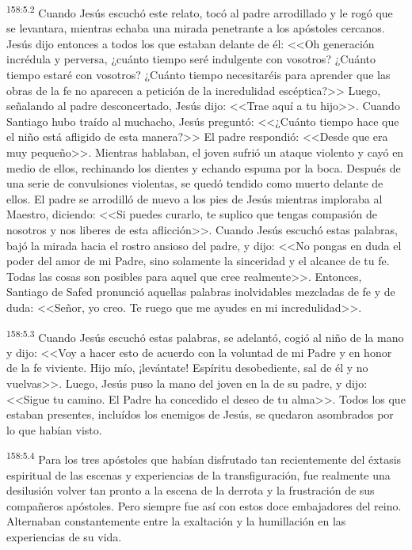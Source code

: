 \par 
\textsuperscript{158:5.2} Cuando Jesús escuchó este relato, tocó al padre arrodillado y le rogó que se levantara, mientras echaba una mirada penetrante a los apóstoles cercanos. Jesús dijo entonces a todos los que estaban delante de él: <<Oh generación incrédula y perversa, ¿cuánto tiempo seré indulgente con vosotros? ¿Cuánto tiempo estaré con vosotros? ¿Cuánto tiempo necesitaréis para aprender que las obras de la fe no aparecen a petición de la incredulidad escéptica?>> Luego, señalando al padre desconcertado, Jesús dijo: <<Trae aquí a tu hijo>>. Cuando Santiago hubo traído al muchacho, Jesús preguntó: <<¿Cuánto tiempo hace que el niño está afligido de esta manera?>> El padre respondió: <<Desde que era muy pequeño>>. Mientras hablaban, el joven sufrió un ataque violento y cayó en medio de ellos, rechinando los dientes y echando espuma por la boca. Después de una serie de convulsiones violentas, se quedó tendido como muerto delante de ellos. El padre se arrodilló de nuevo a los pies de Jesús mientras imploraba al Maestro, diciendo: <<Si puedes curarlo, te suplico que tengas compasión de nosotros y nos liberes de esta aflicción>>. Cuando Jesús escuchó estas palabras, bajó la mirada hacia el rostro ansioso del padre, y dijo: <<No pongas en duda el poder del amor de mi Padre, sino solamente la sinceridad y el alcance de tu fe. Todas las cosas son posibles para aquel que cree realmente>>. Entonces, Santiago de Safed pronunció aquellas palabras inolvidables mezcladas de fe y de duda: <<Señor, yo creo. Te ruego que me ayudes en mi incredulidad>>.

\par 
\textsuperscript{158:5.3} Cuando Jesús escuchó estas palabras, se adelantó, cogió al niño de la mano y dijo: <<Voy a hacer esto de acuerdo con la voluntad de mi Padre y en honor de la fe viviente. Hijo mío, ¡levántate! Espíritu desobediente, sal de él y no vuelvas>>. Luego, Jesús puso la mano del joven en la de su padre, y dijo: <<Sigue tu camino. El Padre ha concedido el deseo de tu alma>>. Todos los que estaban presentes, incluídos los enemigos de Jesús, se quedaron asombrados por lo que habían visto.

\par 
\textsuperscript{158:5.4} Para los tres apóstoles que habían disfrutado tan recientemente del éxtasis espiritual de las escenas y experiencias de la transfiguración, fue realmente una desilusión volver tan pronto a la escena de la derrota y la frustración de sus compañeros apóstoles. Pero siempre fue así con estos doce embajadores del reino. Alternaban constantemente entre la exaltación y la humillación en las experiencias de su vida.

